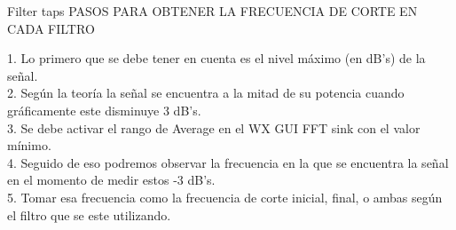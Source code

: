\begin{frame}{Filter taps}
PASOS PARA OBTENER LA FRECUENCIA DE CORTE EN CADA FILTRO
\begin{flushleft}
1.	Lo primero que se debe tener en cuenta es el nivel máximo  (en dB’s) de la señal.\\
2.	Según la teoría la señal se encuentra a la mitad de su potencia cuando gráficamente este disminuye 3 dB’s.\\
3.	Se debe activar el rango de Average en el WX GUI FFT sink  con el valor mínimo.\\
4.	Seguido de eso podremos observar la frecuencia en la que se encuentra la señal en el momento de medir estos -3 dB’s.\\
5.	Tomar esa frecuencia como la frecuencia de corte inicial, final, o ambas según el filtro que se este utilizando. 
\end{flushleft}
\end{frame}




